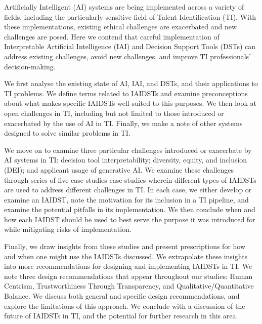 Artificially Intelligent (AI) systems are being implemented across a variety of fields, including the particularly sensitive field of Talent Identification (TI). With these implementations, existing ethical challenges are exacerbated and new challenges are posed. Here we contend that careful implementation of Interpretable Artificial Intelligence (IAI) and Decision Support Tools (DSTs) can address existing challenges, avoid new challenges, and improve TI professionals' decision-making.

We first analyse the existing state of AI, IAI, and DSTs, and their applications to TI problems. We define terms related to IAIDSTs and examine preconceptions about what makes specific IAIDSTs well-suited to this purposes. We then look at open challenges in TI, including but not limited to those introduced or exacerbated by the use of AI in TI. Finally, we make a note of other systems designed to solve similar problems in TI.

We move on to examine three particular challenges introduced or exacerbate by AI systems in TI: decision tool interpretability; diversity, equity, and inclusion (DEI); and applicant usage of generative AI. We examine these challenges through series of five case studies case studies wherein different types of IAIDSTs are used to address different challenges in TI. In each case, we either develop or examine an IAIDST, note the motivation for its inclusion in a TI pipeline, and examine the potential pitfalls in its implementation. We then conclude when and how each IAIDST should be used to best serve the purpose it was introduced for while mitigating risks of implementation.

Finally, we draw insights from these studies and present prescriptions for how and when one might use the IAIDSTs discussed. We extrapolate these insights into more recommendations for designing and implementing IAIDSTs in TI. We note three design recommendations that appear throughout our studies: Human Centrism, Trustworthiness Through Transparency, and Qualitative/Quantitative Balance. We discuss both general and specific design recommendations, and explore the limitations of this approach. We conclude with a discussion of the future of IAIDSTs in TI, and the potential for further research in this area.
